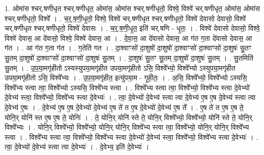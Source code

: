 \documentclass[17pt]{extarticle}
\begin{document}
1. ओमा॑स श्चर्.षणीधृत श्चर्.षणीधृत॒ ओमा॑स॒ ओमा॑स श्चर्.षणीधृतो॒ विश्वे॒ विश्वे॑ चर्.षणीधृत॒ ओमा॑स॒ ओमा॑स श्चर्.षणीधृतो॒ विश्वे᳚ । . च॒र्॒.ष॒णी॒धृ॒तो॒ विश्वे॒ विश्वे॑ चर्.षणीधृत श्चर्.षणीधृतो॒ विश्वे॑ देवासो देवासो॒ विश्वे॑ चर्.षणीधृत श्चर्.षणीधृतो॒ विश्वे॑ देवासः । . च॒र्॒.ष॒णी॒धृ॒त॒ इति॑ चर्.षणि - धृ॒तः॒ । . विश्वे॑ देवासो देवासो॒ विश्वे॒ विश्वे॑ देवास॒ आ दे॑वासो॒ विश्वे॒ विश्वे॑ देवास॒ आ । . दे॒वा॒स॒ आ दे॑वासो देवास॒ आ ग॑त ग॒ता दे॑वासो देवास॒ आ ग॑त । . आ ग॑त ग॒ता ग॑त । . ग॒तेति॑ गत । . दा॒श्वाꣳसो॑ दा॒शुषो॑ दा॒शुषो॑ दा॒श्वाꣳसो॑ दा॒श्वाꣳसो॑ दा॒शुषः॑ सु॒तꣳ सु॒तम् दा॒शुषो॑ दा॒श्वाꣳसो॑ दा॒श्वाꣳसो॑ दा॒शुषः॑ सु॒तम् । . दा॒शुषः॑ सु॒तꣳ सु॒तम् दा॒शुषो॑ दा॒शुषः॑ सु॒तम् । . सु॒तमिति॑ सु॒तम् । . उ॒प॒या॒मगृ॑हीतो ऽस्यस्युपया॒मगृ॑हीत उपया॒मगृ॑हीतो ऽसि॒ विश्वे᳚भ्यो॒ विश्वे᳚भ्यो ऽस्युपया॒मगृ॑हीत उपया॒मगृ॑हीतो ऽसि॒ विश्वे᳚भ्यः । . उ॒प॒या॒मगृ॑हीत॒ इत्यु॑पया॒म - गृ॒ही॒तः॒ । . अ॒सि॒ विश्वे᳚भ्यो॒ विश्वे᳚भ्यो ऽस्यसि॒ विश्वे᳚भ्य स्त्वा त्वा॒ विश्वे᳚भ्यो ऽस्यसि॒ विश्वे᳚भ्य स्त्वा । . विश्वे᳚भ्य स्त्वा त्वा॒ विश्वे᳚भ्यो॒ विश्वे᳚भ्य स्त्वा दे॒वेभ्यो॑ दे॒वेभ्य॑ स्त्वा॒ विश्वे᳚भ्यो॒ विश्वे᳚भ्य स्त्वा दे॒वेभ्यः॑ । . त्वा॒ दे॒वेभ्यो॑ दे॒वेभ्य॑ स्त्वा त्वा दे॒वेभ्य॑ ए॒ष ए॒ष दे॒वेभ्य॑ स्त्वा त्वा दे॒वेभ्य॑ ए॒षः । . दे॒वेभ्य॑ ए॒ष ए॒ष दे॒वेभ्यो॑ दे॒वेभ्य॑ ए॒ष ते॑ त ए॒ष दे॒वेभ्यो॑ दे॒वेभ्य॑ ए॒ष ते᳚ । . ए॒ष ते॑ त ए॒ष ए॒ष ते॒ योनि॒र् योनि॑ स्त ए॒ष ए॒ष ते॒ योनिः॑ । . ते॒ योनि॒र् योनि॑ स्ते ते॒ योनि॒र् विश्वे᳚भ्यो॒ विश्वे᳚भ्यो॒ योनि॑ स्ते ते॒ योनि॒र् विश्वे᳚भ्यः । . योनि॒र् विश्वे᳚भ्यो॒ विश्वे᳚भ्यो॒ योनि॒र् योनि॒र् विश्वे᳚भ्य स्त्वा त्वा॒ विश्वे᳚भ्यो॒ योनि॒र् योनि॒र् विश्वे᳚भ्य स्त्वा । . विश्वे᳚भ्य स्त्वा त्वा॒ विश्वे᳚भ्यो॒ विश्वे᳚भ्य स्त्वा दे॒वेभ्यो॑ दे॒वेभ्य॑ स्त्वा॒ विश्वे᳚भ्यो॒ विश्वे᳚भ्य स्त्वा दे॒वेभ्यः॑ । . त्वा॒ दे॒वेभ्यो॑ दे॒वेभ्य॑ स्त्वा त्वा दे॒वेभ्यः॑ । . दे॒वेभ्य॒ इति॑ दे॒वेभ्यः॑ । \newline
\pagebreak
{}
\end{document}
